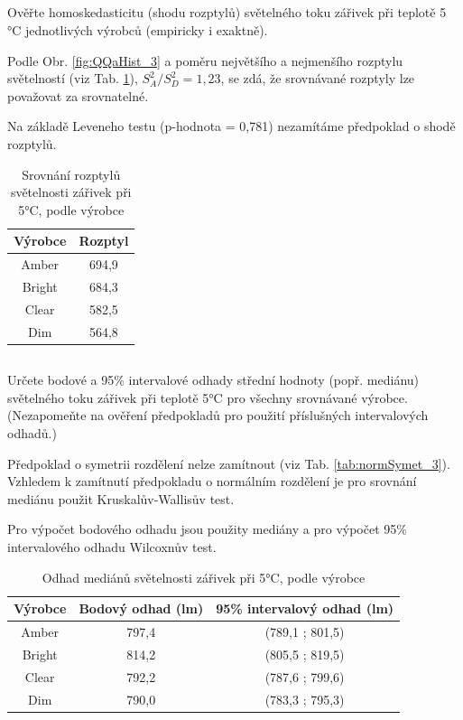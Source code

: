 \documentclass[czech]{article}%
\begin{document}
\newpage
\subsection{}
Ověřte homoskedasticitu (shodu rozptylů) světelného toku zářivek při teplotě 5 °C jednotlivých výrobců (empiricky i exaktně).

Podle Obr. \ref{fig:QQaHist_3} a poměru největšího a nejmenšího rozptylu světelností 
(viz Tab. \ref{tab:rozptyl_3}), $S_{A}^2/S_{D}^2 = 1,23$, se zdá, že srovnávané rozptyly lze považovat za srovnatelné.

Na základě Leveneho testu (p-hodnota = 0,781) nezamítáme předpoklad o shodě rozptylů.

\begin{table}[H]
	\centering
	\caption{Srovnání rozptylů světelnosti zářivek při 5°C, podle výrobce}
	\label{tab:rozptyl_3}
    \begin{tabular}{c|c}
        Výrobce & Rozptyl \\
        \hline
        Amber   & 694,9   \\
        \hline
        Bright  & 684,3   \\
        \hline
        Clear   & 582,5   \\
        \hline
        Dim     & 564,8   \\
    \end{tabular}
\end{table}


\newpage
\subsection{}
Určete bodové a 95\% intervalové odhady střední hodnoty (popř. mediánu) 
světelného toku zářivek při teplotě 5°C pro všechny srovnávané výrobce. 
(Nezapomeňte na ověření předpokladů pro použití příslušných intervalových odhadů.)

Předpoklad o symetrii rozdělení nelze zamítnout (viz Tab. \ref{tab:normSymet_3}).
Vzhledem k zamítnutí předpokladu o normálním rozdělení je pro srovnání mediánu použit Kruskalův-Wallisův test.

Pro výpočet bodového odhadu jsou použity mediány a pro výpočet 95\% intervalového odhadu Wilcoxnův test.

\begin{table}[H]
	\centering
	\caption{Odhad mediánů světelnosti zářivek při 5°C, podle výrobce}
	\label{tab:mediany_3}
    \begin{tabular}{c|c|c}
        Výrobce & Bodový odhad (lm) & 95\% intervalový odhad (lm) \\
        \hline
        Amber   & 797,4             & (789,1 ; 801,5)             \\
        \hline
        Bright  & 814,2             & (805,5 ; 819,5)             \\
        \hline
        Clear   & 792,2             & (787,6 ; 799,6)             \\
        \hline
        Dim     & 790,0             & (783,3 ; 795,3)             \\
    \end{tabular}
\end{table}
\end{document}
